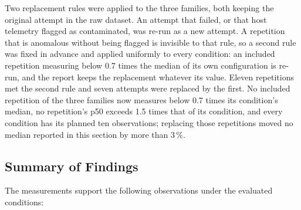 Two replacement rules were applied to the three families, both keeping the
original attempt in the raw dataset. An attempt that failed, or that host
telemetry flagged as contaminated, was re-run as a new attempt. A repetition
that is anomalous without being flagged is invisible to that rule, so a second
rule was fixed in advance and applied uniformly to every condition: an included
repetition measuring below 0.7 times the median of its own configuration is
re-run, and the report keeps the replacement whatever its value. Eleven
repetitions met the second rule and seven attempts were replaced by the first.
No included repetition of the three families now measures below 0.7 times its
condition's median, no repetition's p50 exceeds 1.5 times that of its
condition, and every condition has its planned ten observations; replacing
those repetitions moved no median reported in this section by more than
3\,\%.

\subsection{Summary of Findings}

The measurements support the following observations under the evaluated
conditions:

